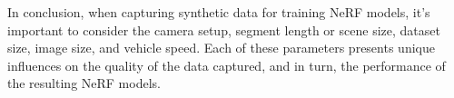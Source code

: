 In conclusion, when capturing synthetic data for training NeRF models, it's important to consider the camera setup, segment length or scene size, dataset size, image size, and vehicle speed. Each of these parameters presents unique influences on the quality of the data captured, and in turn, the performance of the resulting NeRF models.


\begin{comment}
The critical factors that must be considered when capturing synthetic data for training NeRF models, as inferred from the discussed baseline experiments, encompass camera setup, capacity, number of frames, image size, and vehicle speed. Each of these factors demonstrates a unique impact on the performance of the resulting models.

Camera setup plays a significant role in determining the quality of data captured for NeRF models. The experiments revealed that certain camera arrangements, specifically a setup with two cameras at -10$^{\circ}$ and 10$^{\circ}$ yaw, can result in superior SSIM and LPIPS scores, indicating more visually similar and perceptually pleasing images. This finding can be attributed to the degree of overlap between images captured by each camera in the setup. However, the experiments also highlight that camera arrangements were arbitrary and future research may investigate more realistic setups to better generalize the results.

The capacity, or the length of the road segment covered, also impacts the performance of the NeRF models. Even though longer segments led to lower scores across the metrics, these were still selected as the baseline to ensure a diverse range of environmental exposure for the model. It was noticed that the quality of renders deteriorated, especially in terms of increased blur, as segment length increased. Hence, the capacity of data has implications on the clarity and diversity of the training set, which could potentially influence the robustness of the model to diverse scenarios.

The number of frames in the dataset is another crucial factor. An optimal balance between the number of images and the image resolution is important for efficient training. In the experiments, a dataset with 225 images, each with a resolution of $600 \times 450$, covered approximately all of the input pixels by the end of training. However, a dataset with too many or too few images could result in either underutilization or overutilization of the pixels during training. Additionally, a decrease in PSNR with a drop in the number of frames points to the role of variety in the dataset.


\end{comment}

